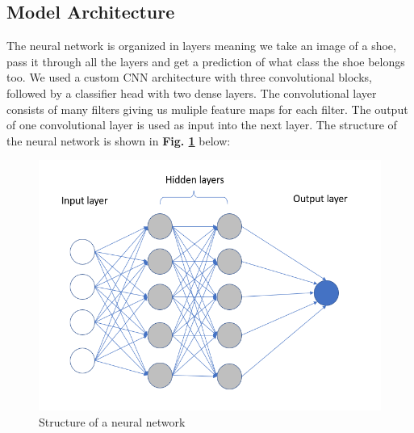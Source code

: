 \documentclass[11pt,a4paper]{article}
\begin{document}
\subsection{Model Architecture}
The neural network is organized in layers meaning we take an image of a shoe, pass it through all the layers and get a prediction of what class the shoe belongs too. We used a custom CNN architecture with three convolutional blocks, followed by a classifier head with two dense layers. The convolutional layer consists of many filters giving us muliple feature maps for each filter.  The output of one convolutional layer is used as input into the next layer. The structure of the neural network is shown in \textbf{Fig. \ref{neural_network}} below:

 \begin{figure}[h!]
\centering
  \includegraphics[width=0.75\linewidth]{neural network.png}
  \caption{Structure of a neural network}
  \label{neural_network}
\end{figure}
\end{document}
